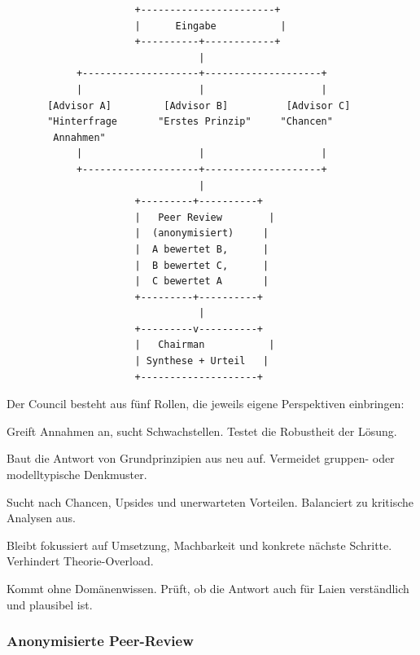\begin{verbatim}
                      +-----------------------+
                      |      Eingabe           |
                      +----------+------------+
                                 |
            +--------------------+--------------------+
            |                    |                    |
       [Advisor A]         [Advisor B]          [Advisor C]
       "Hinterfrage       "Erstes Prinzip"     "Chancen"
        Annahmen"
            |                    |                    |
            +--------------------+--------------------+
                                 |
                      +---------+----------+
                      |   Peer Review        |
                      |  (anonymisiert)     |
                      |  A bewertet B,      |
                      |  B bewertet C,      |
                      |  C bewertet A       |
                      +---------+----------+
                                 |
                      +---------v----------+
                      |   Chairman           |
                      | Synthese + Urteil   |
                      +--------------------+
\end{verbatim}

Der Council besteht aus fünf Rollen, die jeweils eigene Perspektiven einbringen:

\begin{description}[leftmargin=*,style=nextline]
    \item[Devil's Advocate] Greift Annahmen an, sucht Schwachstellen. Testet die Robustheit der Lösung.
    \item[First Principles] Baut die Antwort von Grundprinzipien aus neu auf. Vermeidet gruppen- oder modelltypische Denkmuster.
    \item[Optimist] Sucht nach Chancen, Upsides und unerwarteten Vorteilen. Balanciert zu kritische Analysen aus.
    \item[Executor] Bleibt fokussiert auf Umsetzung, Machbarkeit und konkrete nächste Schritte. Verhindert Theorie-Overload.
    \item[Outsider] Kommt ohne Domänenwissen. Prüft, ob die Antwort auch für Laien verständlich und plausibel ist.
\end{description}

\subsubsection{Anonymisierte Peer-Review}

